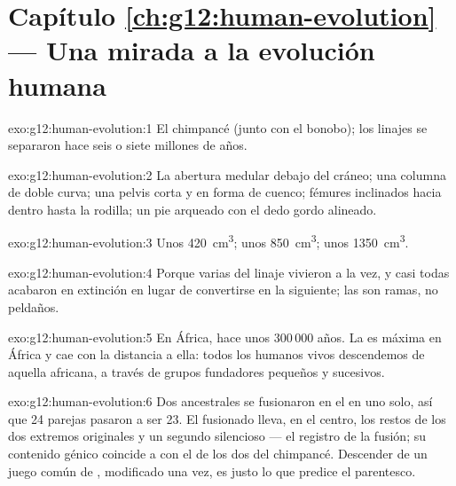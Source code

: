 \section*{Capítulo \ref{ch:g12:human-evolution} --- Una mirada a la evolución humana}

\begin{solution}{exo:g12:human-evolution:1}
El chimpancé (junto con el bonobo); los linajes se separaron hace seis
o siete millones de años.
\end{solution}

\begin{solution}{exo:g12:human-evolution:2}
La abertura medular debajo del cráneo; una columna de doble curva; una
pelvis corta y en forma de cuenco; fémures inclinados hacia dentro
hasta la rodilla; un pie arqueado con el dedo gordo alineado.
\end{solution}

\begin{solution}{exo:g12:human-evolution:3}
Unos \qty{420}{cm^3}; unos \qty{850}{cm^3}; unos \qty{1350}{cm^3}.
\end{solution}

\begin{solution}{exo:g12:human-evolution:4}
Porque varias  del linaje vivieron a la vez, y casi todas
acabaron en extinción en lugar de convertirse en la siguiente; las
 son ramas, no peldaños.
\end{solution}

\begin{solution}{exo:g12:human-evolution:5}
En África, hace unos 300\,000 años. La  es máxima en
África y cae con la distancia a ella: todos los humanos vivos
descendemos de aquella  africana, a través de grupos
fundadores pequeños y sucesivos.
\end{solution}

\begin{solution}{exo:g12:human-evolution:6}
Dos  ancestrales se fusionaron en el  en uno
solo, así que 24 parejas pasaron a ser 23. El  fusionado
lleva, en el centro, los restos de los dos extremos originales y un
segundo  silencioso --- el registro de la fusión; su
contenido génico coincide  a  con el de los dos  del
chimpancé. Descender de un juego común de , modificado una
vez, es justo lo que predice el parentesco.
\end{solution}

